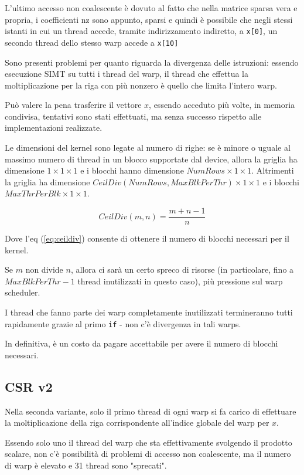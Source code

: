 \documentclass[a4paper,9pt]{extarticle}
\begin{document}
L'ultimo accesso non coalescente 
è dovuto al fatto che nella matrice sparsa vera e propria, i coefficienti nz sono
appunto, sparsi e quindi è possibile che negli stessi istanti in cui un thread accede, tramite
indirizzamento indiretto, a \texttt{x[0]}, un secondo thread dello stesso warp 
accede a \texttt{x[10]}

Sono presenti problemi per quanto riguarda la divergenza delle istruzioni: essendo esecuzione SIMT su tutti i thread del
warp, il thread che effettua la moltiplicazione per la riga con più nonzero è quello che limita l'intero warp.

Può valere la pena trasferire il vettore $x$, essendo acceduto più volte, in memoria condivisa, tentativi sono stati
effettuati, ma senza successo rispetto alle implementazioni realizzate.

Le dimensioni del kernel sono legate al numero di righe: se è minore o uguale al massimo numero di thread in un blocco
supportate dal device, allora la griglia ha dimensione $1\times1\times1$ e i blocchi hanno dimensione 
$NumRows\times1\times1$. Altrimenti la griglia ha dimensione $CeilDiv(NumRows,MaxBlkPerThr)\times1\times1$ e i blocchi
$MaxThrPerBlk\times1\times1$. 

\begin{equation}\label{eq:ceildiv}
CeilDiv(m,n) = \frac{m + n - 1}{n}
\end{equation}

Dove l'eq (\ref{eq:ceildiv}) consente di ottenere il numero di blocchi necessari per il kernel.

Se $m$ non divide $n$, allora ci sarà un certo spreco di risorse 
(in particolare, fino a $MaxBlkPerThr - 1$ thread inutilizzati in questo caso), più pressione sul warp scheduler.

I thread che fanno parte dei warp completamente inutilizzati termineranno tutti rapidamente grazie 
al primo \texttt{if} - non c'è divergenza in tali warps.

In definitiva, è un costo da pagare accettabile per avere il numero di blocchi necessari.

\subsection{CSR v2}
Nella seconda variante, solo il primo thread di ogni warp si fa carico di effettuare la moltiplicazione della riga 
corrispondente all'indice globale del warp per $x$.

Essendo solo uno il thread del warp che sta effettivamente svolgendo il prodotto scalare, non c'è possibilità di
problemi di accesso non coalescente, ma il numero di warp è elevato e 31 thread sono "sprecati".
\end{document}
